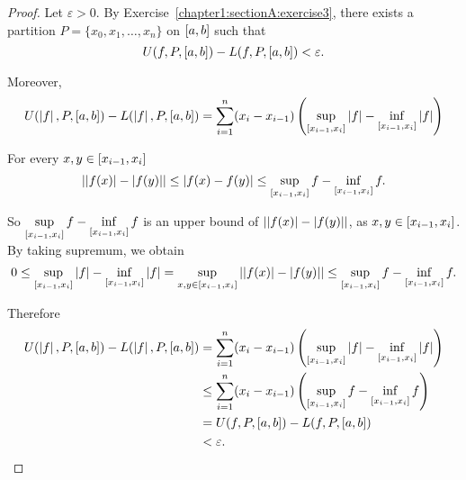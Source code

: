 \begin{proof}
    Let $\varepsilon > 0$. By Exercise~\ref{chapter1:sectionA:exercise3}, there exists a partition $P = \{ x_{0}, x_{1}, \ldots, x_{n} \}$ on $\left[{a, b}\right]$ such that
    \[
        U(f, P, \left[{a, b}\right]) - L(f, P, \left[{a, b}\right]) < \varepsilon.
    \]

    Moreover,
    \begin{align*}
        U(\left\vert{f}\right\vert, P, \left[{a, b}\right]) - L(\left\vert{f}\right\vert, P, \left[{a, b}\right]) = \sum^{n}_{i=1}(x_{i} - x_{i-1})\left(\sup\limits_{\left[{x_{i-1}, x_{i}}\right]}\left\vert{f}\right\vert - \inf\limits_{\left[{x_{i-1}, x_{i}}\right]}\left\vert{f}\right\vert\right)
    \end{align*}

    For every $x, y\in\left[{x_{i-1}, x_{i}}\right]$
    \[
        \left\vert{\left\vert{f(x)}\right\vert - \left\vert{f(y)}\right\vert}\right\vert \leq \left\vert{f(x) - f(y)}\right\vert \leq \sup\limits_{\left[{x_{i-1}, x_{i}}\right]}f - \inf\limits_{\left[{x_{i-1}, x_{i}}\right]}f.
    \]

    So $\sup\limits_{\left[{x_{i-1}, x_{i}}\right]}f - \inf\limits_{\left[{x_{i-1}, x_{i}}\right]}f$ is an upper bound of $\left\vert{\left\vert{f(x)}\right\vert - \left\vert{f(y)}\right\vert}\right\vert$, as $x, y\in\left[{x_{i-1}, x_{i}}\right]$. By taking supremum, we obtain
    \[
        0\leq \sup\limits_{\left[{x_{i-1}, x_{i}}\right]}\left\vert{f}\right\vert - \inf\limits_{\left[{x_{i-1}, x_{i}}\right]}\left\vert{f}\right\vert = \sup\limits_{x, y\in\left[{x_{i-1},x_{i}}\right]}\left\vert{\left\vert{f(x)}\right\vert - \left\vert{f(y)}\right\vert}\right\vert \leq \sup\limits_{\left[{x_{i-1}, x_{i}}\right]}f - \inf\limits_{\left[{x_{i-1}, x_{i}}\right]}f.
    \]

    Therefore
    \begin{align*}
        U(\left\vert{f}\right\vert, P, \left[{a, b}\right]) - L(\left\vert{f}\right\vert, P, \left[{a, b}\right]) & = \sum^{n}_{i=1}(x_{i} - x_{i-1})\left(\sup\limits_{\left[{x_{i-1}, x_{i}}\right]}\left\vert{f}\right\vert - \inf\limits_{\left[{x_{i-1}, x_{i}}\right]}\left\vert{f}\right\vert\right) \\
                                                                                    & \leq \sum^{n}_{i=1}(x_{i} - x_{i-1})\left(\sup\limits_{\left[{x_{i-1}, x_{i}}\right]}f - \inf\limits_{\left[{x_{i-1}, x_{i}}\right]}f\right)          \\
                                                                                    & = U(f, P, \left[{a, b}\right]) - L(f, P, \left[{a, b}\right])                                                                                         \\
                                                                                    & < \varepsilon.
    \end{align*}


\end{proof}
